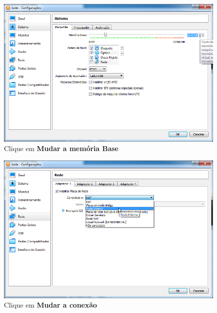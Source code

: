 \documentclass[10pt]{article}
\begin{document}
\begin{figure}[H]
    \centering
    \caption{Clique em \textbf{Mudar a memória Base}}
    \label{fig:3110}
    \includegraphics[width=\linewidth]{images/ativacao_das_maquinas_virtuais/configuracao_inicial_das_maquinas_virtuais/010.png}
\end{figure}
\begin{figure}[H]
    \centering
    \caption{Clique em \textbf{Mudar a conexão}}
    \label{fig:3111}
    \includegraphics[width=\linewidth]{images/ativacao_das_maquinas_virtuais/configuracao_inicial_das_maquinas_virtuais/011.png}
\end{figure}
\end{document}
